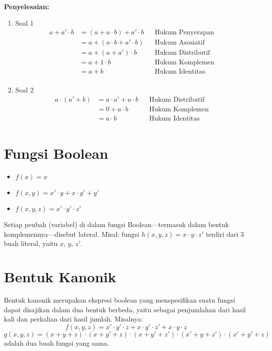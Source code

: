 \documentclass[11pt]{article}
\theoremstyle{definitionstyle}
\theoremstyle{theoremstyle}
\theoremstyle{examplestyle}
\begin{document}
\textbf{Penyelesaian:}
\begin{enumerate}[left=0pt, itemsep=1.5pt, topsep=1.5pt]
    \item Soal 1
    \begin{align*}
        a + a' \cdot b &= (a + a \cdot b) + a' \cdot b &&\text{Hukum Penyerapan} \\
        &= a + (a \cdot b + a' \cdot b) &&\text{Hukum Asosiatif} \\
        &= a + (a + a') \cdot b &&\text{Hukum Distributif} \\
        &= a + 1 \cdot b &&\text{Hukum Komplemen} \\
        &= a + b &&\text{Hukum Identitas} \\
    \end{align*}
    \item Soal 2
    \begin{align*}
        a \cdot (a' + b) &= a \cdot a' + a \cdot b &&\text{Hukum Distributif} \\
        &= 0 + a \cdot b &&\text{Hukum Komplemen} \\
        &= a \cdot b &&\text{Hukum Identitas} \\
    \end{align*}
\end{enumerate}

\section{Fungsi Boolean}
\begin{example}
    \begin{itemize}[left=0pt, itemsep=1.5pt, topsep=1.5pt]
        \item $f(x) = x$
        \item $f(x, y) = x' \cdot y + x \cdot y' + y'$
        \item $f(x, y, z) = x' \cdot y' \cdot z'$
    \end{itemize}
\end{example}

Setiap peubah (variabel) di dalam fungsi Boolean—termasuk dalam bentuk komplemennya—disebut lateral. Misal: fungsi $h(x, y ,z) = x \cdot y \cdot z'$ terdiri dari 3 buah literal, yaitu $x$, $y$, $z'$. \\
\section{Bentuk Kanonik}
Bentuk kanonik merupakan ekspresi boolean yang menspesifikan suatu fungsi dapat disajikan dalam dua bentuk berbeda, yaitu sebagai penjumlahan dari hasil kali dan perkalian dari hasil jumlah. Misalnya:
$$ f(x, y, z) = x' \cdot y' \cdot z + x \cdot y' \cdot z' + x \cdot y \cdot z$$
$$ g(x, y, z) = (x + y + z) \cdot (x + y' + z) \cdot (x + y' + z') \cdot (x' + y + z') \cdot (x' + y' + z)$$
adalah dua buah fungsi yang sama.
\end{document}
